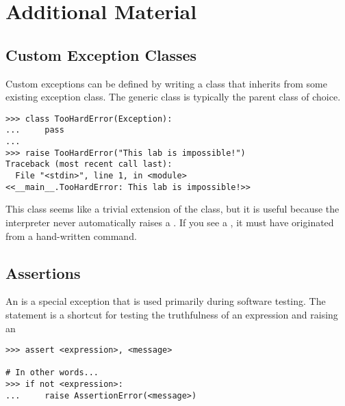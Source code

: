\newpage

\section*{Additional Material} %

\subsection*{Custom Exception Classes} %

Custom exceptions can be defined by writing a class that inherits from some existing exception class.
The generic  class is typically the parent class of choice.

\begin{lstlisting}
>>> class TooHardError(Exception):
...     pass
...
>>> raise TooHardError("This lab is impossible!")
Traceback (most recent call last):
  File "<stdin>", line 1, in <module>
<<__main__.TooHardError: This lab is impossible!>>
\end{lstlisting}

This class seems like a trivial extension of the  class, but it is useful because the interpreter never automatically raises a .
If you see a , it must have originated from a hand-written  command.

\subsection*{Assertions} %

An  is a special exception that is used primarily during software testing.
The  statement is a shortcut for testing the truthfulness of an expression and raising an 

\begin{lstlisting}
>>> assert <expression>, <message>

# In other words...
>>> if not <expression>:
...     raise AssertionError(<message>)
\end{lstlisting}

\begin{comment}
\subsection*{Buffering} %
Details about file.flush(), the buffer argument for open(), and reading large files.
\end{comment}

